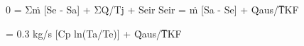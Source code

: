 0 = Σṁ [Se - Sa] + ΣQ̇/Tj + Seir  
Seir = ṁ [Sa - Se] + Q̇aus/T̅KF  

= 0.3 kg/s [Cp ln(Ta/Te)] + Q̇aus/T̅KF